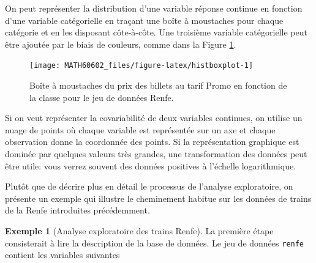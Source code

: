 \documentclass[
  11pt,
  letterpaper,
]{book}
\theoremstyle{definition}
\theoremstyle{definition}
\newtheorem{example}{Exemple}[chapter]
\theoremstyle{definition}
\theoremstyle{remark}
\begin{document}
On peut représenter la distribution d'une variable réponse continue en fonction d'une variable catégorielle en traçant une boîte à moustaches pour chaque catégorie et en les disposant côte-à-côte. Une troisième variable catégorielle peut être ajoutée par le biais de couleurs, comme dans la Figure \ref{fig:histboxplot}.

\begin{figure}

{\centering \texttt{[image: MATH60602\_files/figure-latex/histboxplot-1]} 

}

\caption{Boîte à moustaches du prix des billets au tarif Promo en fonction de la classe pour le jeu de données Renfe.}\label{fig:histboxplot}
\end{figure}

Si on veut représenter la covariabilité de deux variables continues, on utilise un nuage de points où chaque variable est représentée sur un axe et chaque observation donne la coordonnée des points. Si la représentation graphique est dominée par quelques valeurs très grandes, une transformation des données peut être utile: vous verrez souvent des données positives à l'échelle logarithmique.

Plutôt que de décrire plus en détail le processus de l'analyse exploratoire, on présente un exemple qui illustre le cheminement habitue sur les données de trains de la Renfe introduites précédemment.

\begin{example}[Analyse exploratoire des trains Renfe]
\protect\hypertarget{exm:renfe-aed}{}{\label{exm:renfe-aed} {} }La première étape consisterait à lire la description de la base de données. Le jeu de données \texttt{renfe} contient les variables suivantes
\end{example}
\end{document}
